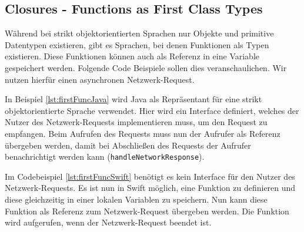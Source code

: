 \subsection*{Closures - Functions as First Class Types}
\label{ch:closures}
Während bei strikt objektorientierten Sprachen nur Objekte und primitive Datentypen existieren, gibt es Sprachen, bei denen Funktionen als Typen existieren. Diese Funktionen können auch als Referenz in eine Variable gespeichert werden. Folgende Code Beispiele sollen dies veranschaulichen. Wir nutzen hierfür einen asynchronen Netzwerk-Request\cite{Apple:2014sp}.

 In Beispiel \ref{lst:firstFuncJava} wird Java als Repräsentant für eine strikt objektorientierte Sprache verwendet. Hier wird ein Interface definiert, welches der Nutzer des Netzwerk-Requests implementieren muss, um den Request zu empfangen. Beim Aufrufen des Requests muss nun der Aufrufer als Referenz übergeben werden, damit bei Abschließen des Requests der Aufrufer benachrichtigt werden kann (\lstinline{handleNetworkResponse}). 

Im Codebeispiel \ref{lst:firstFuncSwift} benötigt es kein Interface für den Nutzer des Netzwerk-Requests. Es ist nun in Swift möglich, eine Funktion zu definieren und diese gleichzeitig in einer lokalen Variablen zu speichern. Nun kann diese Funktion als Referenz zum Netzwerk-Request übergeben werden. Die Funktion wird aufgerufen, wenn der Netzwerk-Request beendet ist. 

